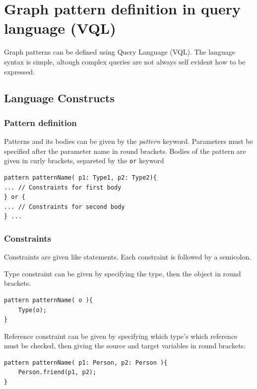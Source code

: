 \chapter{Graph pattern definition in \viatra{} query language (VQL)}

Graph patterns can be defined using \viatra{} Query Language (VQL). 
The language syntax is simple, altough complex queries are not always self evident how to be expressed.

\section{ Language Constructs }

\subsection{Pattern definition}
Patterns and its bodies can be given by the \emph{pattern} keyword. 
Parameters must be specified after the parameter name in round brackets. 
Bodies of the pattern are given in curly brackets, separeted by the \texttt{or} keyword

\begin{minipage}{\textwidth}
\begin{lstlisting}[language=vql]
pattern patternName( p1: Type1, p2: Type2){
... // Constraints for first body
} or {
... // Constraints for second body
} ...
\end{lstlisting}
\end{minipage}


\subsection{Constraints}
Constraints are given like statements. 
Each constraint is followed by a semicolon.

\vspace{\abovedisplayskip}
\begin{minipage}{\textwidth}
Type constraint can be given by specifying the type, then the object in round brackets.
\begin{lstlisting}[language=vql]
pattern patternName( o ){
	Type(o);
}
\end{lstlisting}
\end{minipage}
\vspace{\belowdisplayskip}

\begin{minipage}{\textwidth}
Reference constraint can be given by specifying which type's which reference must be checked, then giving the source and target variables in round brackets:
\begin{lstlisting}[language=vql]
pattern patternName( p1: Person, p2: Person ){
	Person.friend(p1, p2);
}
\end{lstlisting}
\end{minipage}
\vspace{\belowdisplayskip}

